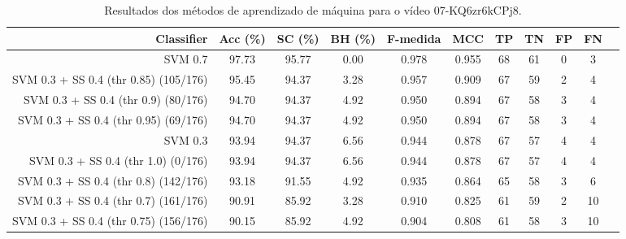 \begin{table}[!htb]
\centering
\caption{Resultados dos métodos de aprendizado de máquina para o vídeo 07-KQ6zr6kCPj8.}
\label{tab:07-KQ6zr6kCPj8}
\begin{tabular}{r|c|c|c|c|c|c|c|c|c|c}
\hline\hline
Classifier & Acc (\%) & SC (\%) & BH (\%) & F-medida & MCC & TP & TN & FP & FN \\ \hline
SVM 0.7 & 97.73 & 95.77 & 0.00 & 0.978 & 0.955 & 68 & 61 & 0 & 3 \\ 
SVM 0.3 + SS 0.4 (thr 0.85) (105/176) & 95.45 & 94.37 & 3.28 & 0.957 & 0.909 & 67 & 59 & 2 & 4 \\ 
SVM 0.3 + SS 0.4 (thr 0.9) (80/176) & 94.70 & 94.37 & 4.92 & 0.950 & 0.894 & 67 & 58 & 3 & 4 \\ 
SVM 0.3 + SS 0.4 (thr 0.95) (69/176) & 94.70 & 94.37 & 4.92 & 0.950 & 0.894 & 67 & 58 & 3 & 4 \\ 
SVM 0.3 & 93.94 & 94.37 & 6.56 & 0.944 & 0.878 & 67 & 57 & 4 & 4 \\ 
SVM 0.3 + SS 0.4 (thr 1.0) (0/176) & 93.94 & 94.37 & 6.56 & 0.944 & 0.878 & 67 & 57 & 4 & 4 \\ 
SVM 0.3 + SS 0.4 (thr 0.8) (142/176) & 93.18 & 91.55 & 4.92 & 0.935 & 0.864 & 65 & 58 & 3 & 6 \\ 
SVM 0.3 + SS 0.4 (thr 0.7) (161/176) & 90.91 & 85.92 & 3.28 & 0.910 & 0.825 & 61 & 59 & 2 & 10 \\ 
SVM 0.3 + SS 0.4 (thr 0.75) (156/176) & 90.15 & 85.92 & 4.92 & 0.904 & 0.808 & 61 & 58 & 3 & 10 \\ 
\hline\hline
\end{tabular}
\end{table}
